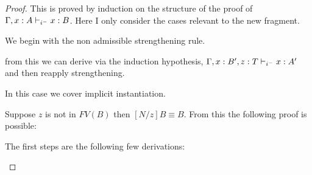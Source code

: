 \begin{proof}

This is proved by induction on the structure of the proof
of $\Gamma, x : A \judgeCI x : B$.  Here I only consider 
the cases relevant to the new fragment.

\setcounter{tcase}{0}

\begin{tcase}
We begin with the non admissible strengthening rule.
\end{tcase}

\begin{prooftree}
\end{prooftree}

from this we can derive via the induction hypothesis, $\Gamma, x : B', z : T \judgeCI x : A'$ 
and then reapply strengthening.

\begin{prooftree}
\end{prooftree}

\begin{tcase}
In this case we cover implicit instantiation.
\end{tcase}

\begin{prooftree}
\end{prooftree}

Suppose $z$ is not in $FV(B)$ then $[N/z]B \equiv B$.   
From this the following proof is possible:

The first steps are the following few derivations:

\begin{prooftree}
\end{prooftree}

\begin{prooftree}


\end{prooftree}
\end{proof}

